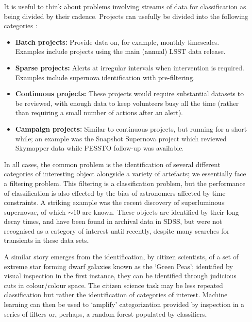 \documentclass{pasa}
\begin{document}
It is useful to think about problems involving streams of data for classification as being divided by their cadence. Projects can usefully be divided into the following categories :

\begin{itemize}

\item \textbf{Batch projects:} Provide data on, for example, monthly timescales. Examples include projects using the main (annual) LSST data release.

\item \textbf{Sparse projects:} Alerts at irregular intervals when intervention is required. Examples include supernova identification with pre-filtering. 

\item \textbf{Continuous projects:} These projects would require substantial datasets to be reviewed, with enough data to keep volunteers busy all the time (rather than requiring a small number of actions after an alert). 

\item \textbf{Campaign projects:} Similar to continuous projects, but running for a short while; an example was the Snapshot Supernova project which reviewed Skymapper data while PESSTO follow-up was available. 

\end{itemize}

In all cases, the common problem is the identification of several different categories of interesting object alongside a variety of artefacts; we essentially face a filtering problem. This filtering is a classification problem, but the performance of classification is also effected by the bias of astronomers affected by time constraints. A striking example was the recent discovery of superluminous supernovae, of which $\sim 10$ are known. These objects are identified by their long decay times, and have been found in archival data in SDSS, but were not recognised as a category of interest until recently, despite many searches for transients in these data sets. 

A similar story emerges from the identification, by citizen scientists, of a set of extreme star forming dwarf galaxies known as the `Green Peas'; identified by visual inspection in the first instance, they can be identified through judicious cuts in colour/colour space. The citizen science task may be less repeated classification but rather the identification of categories of interest. Machine learning can then be used to `amplify' categorization provided by inspection in a series of filters or, perhaps, a random forest populated by classifiers. 
\end{document}

